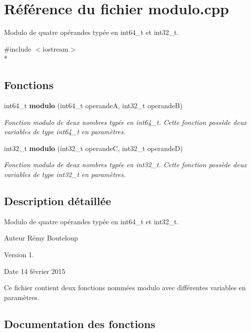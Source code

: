 \section{Référence du fichier modulo.\-cpp}
\label{modulo_8cpp}


Modulo de quatre opérandes typée en int64\-\_\-t et int32\-\_\-t.  


{\ttfamily \#include $<$iostream$>$}\\*
\subsection*{Fonctions}
\begin{DoxyCompactItemize}
\item 
int64\-\_\-t {\bf modulo} (int64\-\_\-t operande\-A, int32\-\_\-t operande\-B)
\begin{DoxyCompactList}\small\item\em Fonction modulo de deux nombres typée en int64\-\_\-t. Cette fonction possède deux variables de type int64\-\_\-t en paramètres. \end{DoxyCompactList}\item 
int32\-\_\-t {\bf modulo} (int32\-\_\-t operande\-C, int32\-\_\-t operande\-D)
\begin{DoxyCompactList}\small\item\em Fonction modulo de deux nombres typée en int32\-\_\-t. Cette fonction possède deux variables de type int32\-\_\-t en paramètres. \end{DoxyCompactList}\end{DoxyCompactItemize}


\subsection{Description détaillée}
Modulo de quatre opérandes typée en int64\-\_\-t et int32\-\_\-t. \begin{DoxyAuthor}{Auteur}
Rémy Bouteloup 
\end{DoxyAuthor}
\begin{DoxyVersion}{Version}
1. 
\end{DoxyVersion}
\begin{DoxyDate}{Date}
14 février 2015
\end{DoxyDate}
Ce fichier contient deux fonctions nommées modulo avec différentes variables en paramètres. 

\subsection{Documentation des fonctions}
